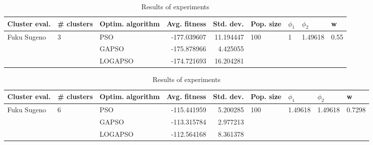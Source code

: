 \documentclass{article}
\begin{document}
\begin{table}
\centering
\caption{Results of experiments}
\begin{tabular}{lllrrllll}
\toprule
               Cluster eval. &        \# clusters & Optim. algorithm &  Avg. fitness &  Std. dev. &            Pop. size &         $\phi_{1}$ &               $\phi_{2}$ &                     w \\
\midrule
\multirow{3}{*}{Fuku Sugeno} & \multirow{3}{*}{3} &              PSO &   -177.039607 &  11.194447 & \multirow{3}{*}{100} & \multirow{3}{*}{1} & \multirow{3}{*}{1.49618} & \multirow{3}{*}{0.55} \\
                             &                    &            GAPSO &   -175.878966 &   4.425055 &                      &                    &                          &                       \\
                             &                    &          LOGAPSO &   -174.721693 &  16.204281 &                      &                    &                          &                       \\
\bottomrule
\end{tabular}
\end{table}
\begin{table}
\centering
\caption{Results of experiments}
\begin{tabular}{lllrrllll}
\toprule
               Cluster eval. &        \# clusters & Optim. algorithm &  Avg. fitness &  Std. dev. &            Pop. size &               $\phi_{1}$ &               $\phi_{2}$ &                       w \\
\midrule
\multirow{3}{*}{Fuku Sugeno} & \multirow{3}{*}{6} &              PSO &   -115.441959 &   5.200285 & \multirow{3}{*}{100} & \multirow{3}{*}{1.49618} & \multirow{3}{*}{1.49618} & \multirow{3}{*}{0.7298} \\
                             &                    &            GAPSO &   -113.315784 &   2.977213 &                      &                          &                          &                         \\
                             &                    &          LOGAPSO &   -112.564168 &   8.361378 &                      &                          &                          &                         \\
\bottomrule
\end{tabular}
\end{table}
\end{document}
